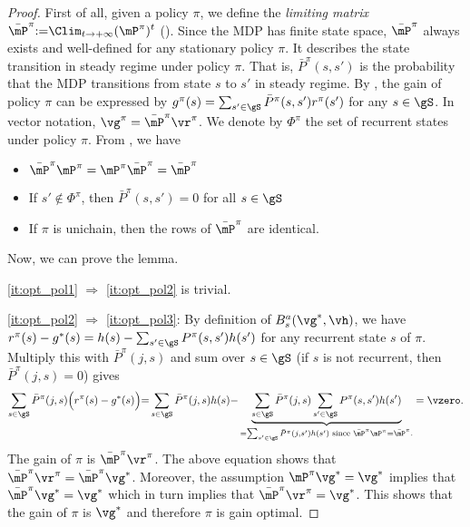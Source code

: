 \begin{proof}
    First of all, given a policy $\pi$, we define the \emph{limiting matrix} $\bar{\mP}^\pi{:=}\displaystyle\Clim_{t\to+\infty}{(\mP^\pi)^t}$ (\cite[Appendix~A.4]{puterman2014markov}). %
    Since the MDP has finite state space, $\bar{\mP}^\pi$ always exists and well-defined for any stationary policy $\pi$.
    It describes the state transition in steady regime under policy $\pi$.
    That is, $\bar{P}^\pi(s,s')$ is the probability that the MDP transitions from state $s$ to $s'$ in steady regime.
    By \cite[Theorem~8.2.6]{puterman2014markov}, the gain of policy $\pi$ can be expressed by $g^\pi(s)=\sum_{s'\in\gS}\bar{P}^\pi(s,s')r^\pi(s')$ for any $s\in\gS$.
    In vector notation, $\vg^\pi=\bar{\mP}^\pi\vr^\pi$.
    We denote by $\Phi^\pi$ the set of recurrent states under policy $\pi$.
    From \cite[Section~A.4]{puterman2014markov}, we have
    \begin{itemize}
        \item $\bar{\mP}^\pi\mP^\pi =\mP^\pi\bar{\mP}^\pi =\bar{\mP}^\pi$
        \item If $s'\notin\Phi^\pi$, then $\bar{P}^\pi(s,s')=0$ for all $s\in\gS$
        \item If $\pi$ is unichain, then the rows of $\bar{\mP}^\pi$ are identical.
    \end{itemize}
    Now, we can prove the lemma.

    \ref{it:opt_pol1} $\Rightarrow$ \ref{it:opt_pol2} is trivial.

    \ref{it:opt_pol2} $\Rightarrow$ \ref{it:opt_pol3}: By definition of $B_s^a(\vg^*,\vh)$, we have $r^{\pi}(s)-g^*(s) = h(s)-\sum_{s'\in\gS} P^{\pi}(s,s')h(s')$ for any recurrent state $s$ of $\pi$.  Multiply this with $\bar{P}^\pi(j,s)$ and sum over $s\in\gS$ (if $s$ is not recurrent, then $\bar{P}^\pi(j,s)=0$) gives
    \begin{align*}
        \sum_{s\in\gS} \bar{P}^\pi(j,s)\Big(r^{\pi}(s)-g^*(s)\Big) {=} \sum_{s\in\gS} \bar{P}^\pi(j,s)h(s) {-} \underbrace{\sum_{s\in\gS} \bar{P}^\pi(j,s)\sum_{s'\in\gS} P^{\pi}(s,s')h(s')}_{=\sum_{s'\in\gS} \bar{P}^\pi(j,s')h(s') \text{ since $\bar{\mP}^\pi\mP^\pi{=}\bar{\mP}^\pi$.}}
        = \vzero.
    \end{align*}
    The gain of $\pi$ is $\bar{\mP}^\pi \vr^\pi$.
    The above equation shows that $\bar{\mP}^\pi\vr^\pi = \bar{\mP}^\pi\vg^*$. Moreover, the assumption  $\mP^\pi\vg^*=\vg^*$ implies that $\bar{\mP}^\pi\vg^*=\vg^*$ which in turn implies that $\bar{\mP}^\pi\vr^\pi=\vg^*$. This shows that the gain of $\pi$ is $\vg^*$ and therefore $\pi$ is gain optimal.


\end{proof}
